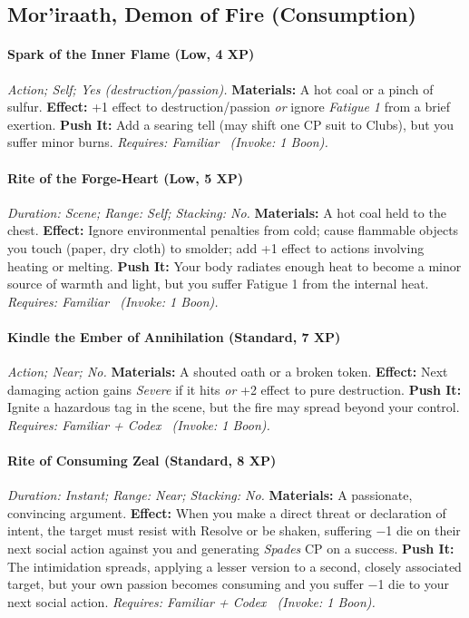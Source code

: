 \subsection{Mor'iraath, Demon of Fire (Consumption)}
\paragraph{Spark of the Inner Flame (Low, 4 XP)} \emph{Action; Self; Yes (destruction/passion).}
\textbf{Materials:} A hot coal or a pinch of sulfur.
\textbf{Effect:} +1 effect to destruction/passion \emph{or} ignore \emph{Fatigue 1} from a brief exertion.
\textbf{Push It:} Add a searing tell (may shift one CP suit to Clubs), but you suffer minor burns.
\emph{Requires: Familiar \ (\textit{Invoke:} 1 Boon).}
\paragraph{Rite of the Forge-Heart (Low, 5 XP)} \emph{Duration: Scene; Range: Self; Stacking: No.}
\textbf{Materials:} A hot coal held to the chest.
\textbf{Effect:} Ignore environmental penalties from cold; cause flammable objects you touch (paper, dry cloth) to smolder; add +1 effect to actions involving heating or melting.
\textbf{Push It:} Your body radiates enough heat to become a minor source of warmth and light, but you suffer Fatigue 1 from the internal heat.
\emph{Requires: Familiar \ (\textit{Invoke:} 1 Boon).}
\paragraph{Kindle the Ember of Annihilation (Standard, 7 XP)} \emph{Action; Near; No.}
\textbf{Materials:} A shouted oath or a broken token.
\textbf{Effect:} Next damaging action gains \emph{Severe} if it hits \emph{or} +2 effect to pure destruction.
\textbf{Push It:} Ignite a hazardous tag in the scene, but the fire may spread beyond your control.
\emph{Requires: Familiar + Codex \ (\textit{Invoke:} 1 Boon).}
\paragraph{Rite of Consuming Zeal (Standard, 8 XP)} \emph{Duration: Instant; Range: Near; Stacking: No.}
\textbf{Materials:} A passionate, convincing argument.
\textbf{Effect:} When you make a direct threat or declaration of intent, the target must resist with Resolve or be shaken, suffering −1 die on their next social action against you and generating \emph{Spades} CP on a success.
\textbf{Push It:} The intimidation spreads, applying a lesser version to a second, closely associated target, but your own passion becomes consuming and you suffer −1 die to your next social action.
\emph{Requires: Familiar + Codex \ (\textit{Invoke:} 1 Boon).}
